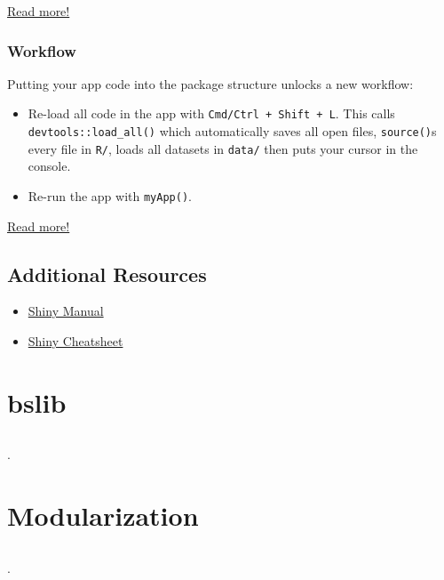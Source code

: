 \documentclass[
]{book}
\providecommand{\tightlist}{%
  \setlength{\itemsep}{0pt}\setlength{\parskip}{0pt}}
\begin{document}
\href{https://mastering-shiny.org/scaling-packaging.html\#deploying-your-app-package}{Read more!}

\hypertarget{workflow}{%
\subsection{Workflow}\label{workflow}}

Putting your app code into the package structure unlocks a new workflow:

\begin{itemize}
\item
  Re-load all code in the app with \texttt{Cmd/Ctrl\ +\ Shift\ +\ L}. This calls \texttt{devtools::load\_all()} which automatically saves all open files, \texttt{source()}s every file in \texttt{R/}, loads all datasets in \texttt{data/} then puts your cursor in the console.
\item
  Re-run the app with \texttt{myApp()}.
\end{itemize}

\href{https://mastering-shiny.org/scaling-packaging.html\#workflow}{Read more!}

\hypertarget{additional-resources-2}{%
\section{Additional Resources}\label{additional-resources-2}}

\begin{itemize}
\tightlist
\item
  \href{https://mastering-shiny.org/}{Shiny Manual}\\
\item
  \href{https://rstudio.github.io/cheatsheets/html/shiny.html}{Shiny Cheatsheet}
\end{itemize}

\hypertarget{bslib}{%
\chapter{bslib}\label{bslib}}

\hypertarget{section}{%
\section{}\label{section}}

.

\hypertarget{modularization}{%
\chapter{Modularization}\label{modularization}}

\hypertarget{section-1}{%
\section{}\label{section-1}}

.

  
\end{document}
